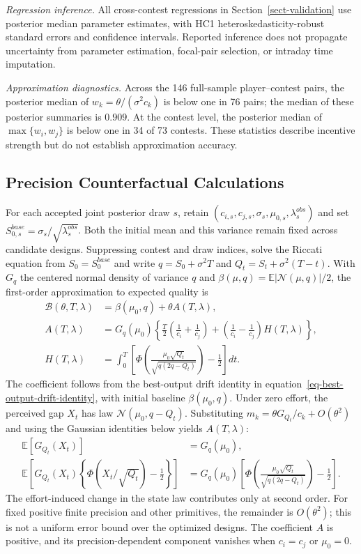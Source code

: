 \documentclass[mnsc]{informs3}
\begin{document}
\begin{APPENDICES}
{\textit{Regression inference.}} All cross-contest regressions in Section~\ref{sect-validation} use posterior median parameter estimates, {with HC1 heteroskedasticity-robust standard errors and confidence intervals. Reported inference does not propagate uncertainty from parameter estimation, focal-pair selection, or intraday time imputation.}

{\textit{Approximation diagnostics.}} Across the 146 full-sample player--contest pairs, the posterior median of $w_k=\theta/(\sigma^2c_k)$ is below one in 76 pairs; the median of these posterior summaries is $0.909$. At the contest level, the posterior median of $\max\{w_i,w_j\}$ is below one in 34 of 73 contests. These statistics describe incentive strength but do not establish approximation accuracy.

\subsection{Precision Counterfactual Calculations}\label{app-precision-counterfactual}

For each accepted joint posterior draw $s$, retain $(c_{i,s},c_{j,s},\sigma_s,\mu_{0,s},\lambda_s^{obs})$ and set $S_{0,s}^{base}=\sigma_s/\sqrt{\lambda_s^{obs}}$. Both the initial mean and this variance remain fixed across candidate designs. Suppressing contest and draw indices, solve the Riccati equation from $S_0=S_0^{base}$ and write $q=S_0+\sigma^2T$ and $Q_t=S_t+\sigma^2(T-t)$. With $G_q$ the centered normal density of variance $q$ and $\beta(\mu,q)=\mathbb E|\mathcal N(\mu,q)|/2$, the first-order approximation to expected quality is
\[
\begin{aligned}
\mathcal B(\theta,T,\lambda)
&=\beta(\mu_0,q)+\theta A(T,\lambda),\\
A(T,\lambda)
&=G_q(\mu_0)\left\{\frac T2\left(\frac1{c_i}+\frac1{c_j}\right)
+\left(\frac1{c_i}-\frac1{c_j}\right)H(T,\lambda)\right\},\\
H(T,\lambda)
&=\int_0^T\left[\Phi\!\left(\frac{\mu_0\sqrt{Q_t}}{\sqrt{q(2q-Q_t)}}\right)-\frac12\right]dt.
\end{aligned}
\]
The coefficient follows from the best-output drift identity in equation~\eqref{eq-best-output-drift-identity}, with initial baseline $\beta(\mu_0,q)$. Under zero effort, the perceived gap $X_t$ has law $\mathcal N(\mu_0,q-Q_t)$. Substituting $m_k=\theta G_{Q_t}/c_k+O(\theta^2)$ and using the Gaussian identities below yields $A(T,\lambda)$:
\[
\begin{aligned}
\mathbb E[G_{Q_t}(X_t)]&=G_q(\mu_0),\\
\mathbb E\!\left[G_{Q_t}(X_t)\left\{\Phi(X_t/\sqrt{Q_t})-\tfrac12\right\}\right]
&=G_q(\mu_0)\left[\Phi\!\left(\frac{\mu_0\sqrt{Q_t}}{\sqrt{q(2q-Q_t)}}\right)-\tfrac12\right].
\end{aligned}
\]
The effort-induced change in the state law contributes only at second order. For fixed positive finite precision and other primitives, the remainder is $O(\theta^2)$; this is not a uniform error bound over the optimized designs. The coefficient $A$ is positive, and its precision-dependent component vanishes when $c_i=c_j$ or $\mu_0=0$.


\end{APPENDICES}
\end{document}
